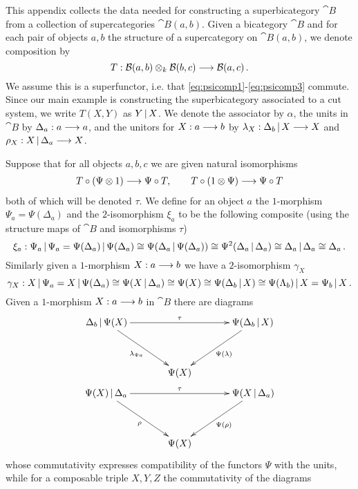 \documentclass[english,letter paper,12pt,leqno]{article}
\theoremstyle{example}
\numberwithin{equation}{section}
\begin{document}
This appendix collects the data needed for constructing a superbicategory $\cat{B}$ from a collection of supercategories $\cat{B}(a,b)$. Given a bicategory $\cat{B}$ and for each pair of objects $a,b$ the structure of a supercategory on $\cat{B}(a,b)$, we denote composition by
\[
T: \mathcal{B}(a, b) \otimes_k \mathcal{B}(b,c) \longrightarrow \mathcal{B}(a,c)\,.
\]
We assume this is a superfunctor, i.e. that \eqref{eq:psicomp1}-\eqref{eq:psicomp3} commute. Since our main example is constructing the superbicategory associated to a cut system, we write $T(X,Y)$ as $Y \,|\, X$. We denote the associator by $\alpha$, the units in $\cat{B}$ by $\Delta_a: a \longrightarrow a$, and the unitors for $X: a \longrightarrow b$ by $\lambda_X: \Delta_b \,|\, X \longrightarrow X$ and $\rho_X: X \,|\, \Delta_a \longrightarrow X$.

Suppose that for all objects $a,b,c$ we are given natural isomorphisms
\begin{align*}
T \circ ( \Psi \otimes 1 ) \longrightarrow \Psi \circ T, \qquad T \circ ( 1 \otimes \Psi ) \longrightarrow \Psi \circ T
\end{align*}
both of which will be denoted $\tau$. We define for an object $a$ the $1$-morphism $\Psi_a = \Psi( \Delta_a )$ and the $2$-isomorphism $\xi_a$ to be the following composite (using the structure maps of $\cat{B}$ and isomorphisms $\tau$)
\[
\xi_a: \Psi_a \,|\, \Psi_a = \Psi( \Delta_a ) \,|\, \Psi( \Delta_a ) \cong \Psi( \Delta_a \,|\, \Psi(\Delta_a ) ) \cong \Psi^2( \Delta_a \,|\, \Delta_a ) \cong \Delta_a \,|\, \Delta_a \cong \Delta_a\,.
\]
Similarly given a $1$-morphism $X: a \longrightarrow b$ we have a $2$-isomorphism $\gamma_X$
\[
\gamma_X: X \,|\, \Psi_a = X \,|\, \Psi( \Delta_a ) \cong \Psi( X \,|\, \Delta_a ) \cong \Psi(X) \cong \Psi( \Delta_b \,|\, X ) \cong \Psi( \Lambda_b ) \,|\, X = \Psi_b \,|\, X\,.
\]
Given a $1$-morphism $X: a \longrightarrow b$ in $\cat{B}$ there are diagrams
\begin{gather}
\xymatrix@R+1pc@C+1pc{
\Delta_b \l \Psi (X) \ar[dr]_-{\lambda_{\Psi a}} \ar[rr]^-{\tau} & & \Psi( \Delta_b \l X ) \ar[dl]^-{\Psi( \lambda )}\\
& \Psi(X)
} \label{eq:psiunitor1}\\
\xymatrix@R+1pc@C+1pc{
\Psi(X) \l \Delta_a \ar[rr]^-{\tau}\ar[dr]_-{\rho} & & \Psi( X \l \Delta_a ) \ar[dl]^-{\Psi(\rho)}\\
& \Psi(X)
} \label{eq:psiunitor2}
\end{gather}
whose commutativity expresses compatibility of the functors $\Psi$ with the units, while for a composable triple $X,Y,Z$ the commutativity of the diagrams
\end{document}
